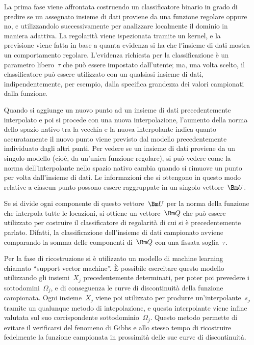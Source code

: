 La prima fase viene affrontata costruendo un classificatore binario in grado di predire se un assegnato insieme di dati proviene da una funzione regolare oppure no, e utilizzandolo successivamente per analizzare localmente il dominio in maniera adattiva.  La regolarità viene ispezionata tramite un kernel, e la previsione viene fatta in base a quanta evidenza si ha che l'insieme di dati mostra un comportamento regolare.  L'evidenza richiesta per la classificazione è un parametro libero~$\tau$ che può essere impostato dall'utente; ma, una volta scelto, il classificatore può essere utilizzato con un qualsiasi insieme di dati, indipendentemente, per esempio, dalla specifica grandezza dei valori campionati dalla funzione.

Quando si aggiunge un nuovo punto ad un insieme di dati precedentemente interpolato e poi si procede con una nuova interpolazione, l'aumento della norma dello spazio nativo tra la vecchia e la nuova interpolante indica quanto accuratamente il nuovo punto viene previsto dal modello precedentemente individuato dagli altri punti.  Per vedere se un insieme di dati proviene da un singolo modello (cioè, da un'unica funzione regolare), si può vedere come la norma dell'interpolante nello spazio nativo cambia quando si rimuove un punto per volta dall'insieme di dati.  Le informazioni che si ottengono in questo modo relative a ciascun punto possono essere raggruppate in un singolo vettore~$\Bm U$.

Se si divide ogni componente di questo vettore~$\Bm U$ per la norma della funzione che interpola tutte le locazioni, si ottiene un vettore~$\Bm Q$ che può essere utilizzato per costruire il classificatore di regolarità di cui si è precedentemente parlato.  Difatti, la classificazione dell'insieme di dati campionato avviene comparando la somma delle componenti di~$\Bm Q$ con una fissata soglia~$\tau$.

Per la fase di ricostruzione si è utilizzato un modello di machine learning chiamato ``support vector machine''.  È possibile esercitare questo modello utilizzando gli insiemi~$X_j$ precedentemente determinati, per poter poi prevedere i sottodomini~$\Omega_j$, e di conseguenza le curve di discontinuità della funzione campionata.  Ogni insieme~$X_j$ viene poi utilizzato per produrre un'interpolante~$s_j$ tramite un qualunque metodo di intepolazione, e questa interpolante viene infine valutata sul suo corrispondente sottodominio~$\Omega_j$.  Questo metodo permette di evitare il verificarsi del fenomeno di Gibbs e allo stesso tempo di ricostruire fedelmente la funzione campionata in prossimità delle sue curve di discontinuità.






















\bye
